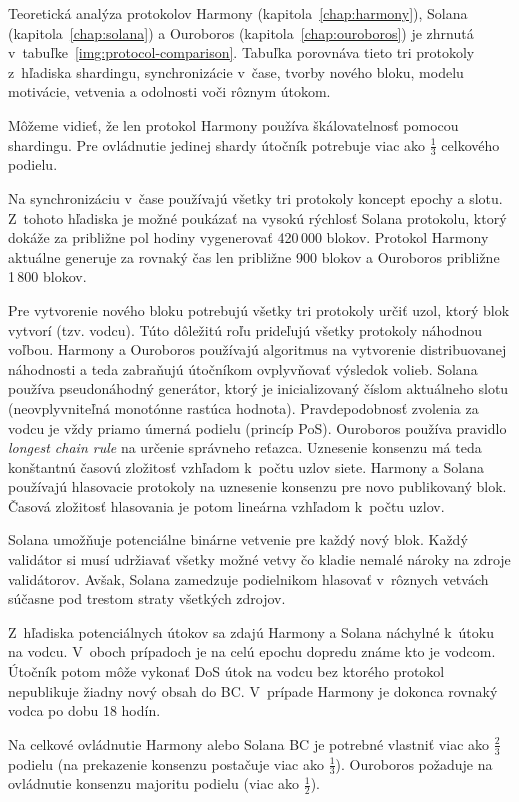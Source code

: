 Teoretická analýza protokolov Harmony (kapitola~\ref{chap:harmony}), Solana (kapitola~\ref{chap:solana}) a Ouroboros (kapitola~\ref{chap:ouroboros}) je zhrnutá v~tabuľke~\ref{img:protocol-comparison}. Tabuľka porovnáva tieto tri protokoly z~hľadiska shardingu, synchronizácie v~čase, tvorby nového bloku, modelu motivácie, vetvenia a odolnosti voči rôznym útokom.

Môžeme vidieť, že len protokol Harmony používa škálovatelnosť pomocou shardingu. Pre ovládnutie jedinej shardy útočník potrebuje viac ako $\frac{1}{3}$ celkového podielu.

Na synchronizáciu v~čase používajú všetky tri protokoly koncept epochy a slotu. Z~tohoto hľadiska je možné poukázať na vysokú rýchlosť Solana protokolu, ktorý dokáže za približne pol hodiny vygenerovať 420\,000 blokov. Protokol Harmony aktuálne generuje za rovnaký čas len približne 900 blokov a Ouroboros približne 1\,800 blokov.

Pre vytvorenie nového bloku potrebujú všetky tri protokoly určiť uzol, ktorý blok vytvorí (tzv. vodcu). Túto dôležitú roľu prideľujú všetky protokoly náhodnou voľbou. Harmony a Ouroboros používajú algoritmus na vytvorenie distribuovanej náhodnosti a teda zabraňujú útočníkom ovplyvňovať výsledok volieb. Solana používa pseudonáhodný generátor, ktorý je inicializovaný číslom aktuálneho slotu (neovplyvniteľná monotónne rastúca hodnota). Pravdepodobnosť zvolenia za vodcu je vždy priamo úmerná podielu (princíp PoS). Ouroboros používa pravidlo \textit{longest chain rule} na určenie správneho reťazca. Uznesenie konsenzu má teda konštantnú časovú zložitosť vzhľadom k~počtu uzlov siete. Harmony a Solana používajú hlasovacie protokoly na uznesenie konsenzu pre novo publikovaný blok. Časová zložitosť hlasovania je potom lineárna vzhľadom k~počtu uzlov.

Solana umožňuje potenciálne binárne vetvenie pre každý nový blok. Každý validátor si musí udržiavať všetky možné vetvy čo kladie nemalé nároky na zdroje validátorov. Avšak, Solana zamedzuje podielnikom hlasovať v~rôznych vetvách súčasne pod trestom straty všetkých zdrojov.

Z~hľadiska potenciálnych útokov sa zdajú Harmony a Solana náchylné k~útoku na vodcu. V~oboch prípadoch je na celú epochu dopredu známe kto je vodcom. Útočník potom môže vykonať DoS útok na vodcu bez ktorého protokol nepublikuje žiadny nový obsah do BC. V~prípade Harmony je dokonca rovnaký vodca po dobu 18 hodín.

Na celkové ovládnutie Harmony alebo Solana BC je potrebné vlastniť viac ako $\frac{2}{3}$ podielu (na prekazenie konsenzu postačuje viac ako $\frac{1}{3}$). Ouroboros požaduje na ovládnutie konsenzu majoritu podielu (viac ako $\frac{1}{2}$).

